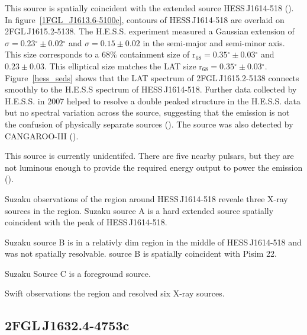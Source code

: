 \documentclass[12pt,preprint]{aastex}
\newcommand{\tev}{\text{TeV}\xspace}
\newcommand{\rsixeight}{{\ensuremath{\text{r}_{68}}}\xspace}
\renewcommand{\deg}{\ensuremath{^\circ}\xspace}
\begin{document}
This source is spatially coincident with the extended
\tev source HESS\,J1614-518 (\cite{hess_plane_survey}). In
figure~\ref{1FGL_J1613.6-5100c}, contours of HESS\,J1614-518 are overlaid
on 2FGL\,J1615.2-5138.  The H.E.S.S. experiment measured a Gaussian
extension of $\sigma=0.23\deg\pm0.02\deg$ and $\sigma=0.15\pm0.02$
in the semi-major and semi-minor axis. This size corresponds
to a 68\% containment size of $\rsixeight=0.35\deg\pm0.03\deg$
and $0.23\pm0.03$.  This elliptical size matches the LAT size
$\rsixeight=0.35\deg\pm0.03\deg$.  Figure~\ref{hess_seds} shows that
the LAT spectrum of 2FGL\,J1615.2-5138 connects smoothly to the H.E.S.S
spectrum of HESS\,J1614-518.  Further data collected by H.E.S.S. in 2007
helped to resolve a double peaked structure in the H.E.S.S. data but no
spectral variation across the source, suggesting that the emission is
not the confusion of physically separate sources (\cite{closer_look_hess_j1614-518}).
The source was also detected by CANGAROO-III (\cite{cangaroo_j1614-518}).

This source is currently unidentifed. There are five nearby pulsars,
but they are not luminous enough to provide the required energy output
to power the \tev emission (\cite{closer_look_hess_j1614-518}).


Suzaku observations of the region around HESS\,J1614-518 reveale three
X-ray sources in the region. Suzaku source A is a hard extended source
spatially coincident with the peak of HESS\,J1614-518. 

Suzaku source B is
in a relativly dim region in the middle of HESS\,J1614-518 and was not
spatially resolvable. source B is spatially coincident with Pisim 22.

Suzaku Source C is a foreground source.

Swift observations the region and resolved six X-ray sources.





\subsection{2FGL\,J1632.4-4753c}
\label{section_2FGL_J1632.4-4753c}
\end{document}
